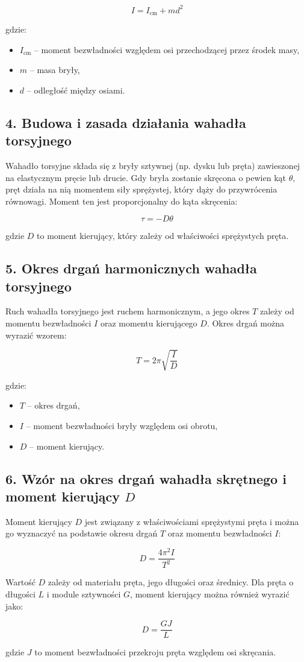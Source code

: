 \documentclass{article}
\begin{document}
{\[
I = I_{\text{cm}} + md^2
\]

gdzie:
\begin{itemize}
    \item \( I_{\text{cm}} \) – moment bezwładności względem osi przechodzącej przez środek masy,
    \item \( m \) – masa bryły,
    \item \( d \) – odległość między osiami.
\end{itemize}

\subsection*{4. Budowa i zasada działania wahadła torsyjnego}
Wahadło torsyjne składa się z bryły sztywnej (np. dysku lub pręta) zawieszonej na elastycznym pręcie lub drucie. Gdy bryła zostanie skręcona o pewien kąt \( \theta \), pręt działa na nią momentem siły sprężystej, który dąży do przywrócenia równowagi. Moment ten jest proporcjonalny do kąta skręcenia:

\[
\tau = -D \theta
\]

gdzie \( D \) to moment kierujący, który zależy od właściwości sprężystych pręta.

\subsection*{5. Okres drgań harmonicznych wahadła torsyjnego}
Ruch wahadła torsyjnego jest ruchem harmonicznym, a jego okres \( T \) zależy od momentu bezwładności \( I \) oraz momentu kierującego \( D \). Okres drgań można wyrazić wzorem:

\[
T = 2\pi \sqrt{\frac{I}{D}}
\]

gdzie:
\begin{itemize}
    \item \( T \) – okres drgań,
    \item \( I \) – moment bezwładności bryły względem osi obrotu,
    \item \( D \) – moment kierujący.
\end{itemize}

\subsection*{6. Wzór na okres drgań wahadła skrętnego i moment kierujący \( D \)}
Moment kierujący \( D \) jest związany z właściwościami sprężystymi pręta i można go wyznaczyć na podstawie okresu drgań \( T \) oraz momentu bezwładności \( I \):

\[
D = \frac{4\pi^2 I}{T^2}
\]

Wartość \( D \) zależy od materiału pręta, jego długości oraz średnicy. Dla pręta o długości \( L \) i module sztywności \( G \), moment kierujący można również wyrazić jako:

\[
D = \frac{G J}{L}
\]

gdzie \( J \) to moment bezwładności przekroju pręta względem osi skręcania.}
\end{document}
